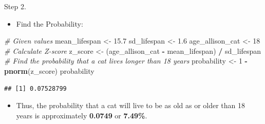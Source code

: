 \documentclass[
  ignorenonframetext,
]{beamer}
\newenvironment{Shaded}{\begin{snugshade}}{\end{snugshade}}
\newcommand{\CommentTok}[1]{\textcolor[rgb]{0.56,0.35,0.01}{\textit{#1}}}
\newcommand{\DecValTok}[1]{\textcolor[rgb]{0.00,0.00,0.81}{#1}}
\newcommand{\FloatTok}[1]{\textcolor[rgb]{0.00,0.00,0.81}{#1}}
\newcommand{\FunctionTok}[1]{\textcolor[rgb]{0.13,0.29,0.53}{\textbf{#1}}}
\newcommand{\NormalTok}[1]{#1}
\newcommand{\OtherTok}[1]{\textcolor[rgb]{0.56,0.35,0.01}{#1}}
\newcommand{\SpecialCharTok}[1]{\textcolor[rgb]{0.81,0.36,0.00}{\textbf{#1}}}
\providecommand{\tightlist}{%
  \setlength{\itemsep}{0pt}\setlength{\parskip}{0pt}}
\begin{document}
\begin{frame}[fragile]{Step 2.}
\label{step-2.}
\begin{itemize}
\tightlist
\item
  Find the Probability:
\end{itemize}

\begin{Shaded}
\begin{Highlighting}[]
\CommentTok{\# Given values}
\NormalTok{mean\_lifespan }\OtherTok{\textless{}{-}} \FloatTok{15.7}
\NormalTok{sd\_lifespan }\OtherTok{\textless{}{-}} \FloatTok{1.6}
\NormalTok{age\_allison\_cat }\OtherTok{\textless{}{-}} \DecValTok{18}
\CommentTok{\# Calculate Z{-}score}
\NormalTok{z\_score }\OtherTok{\textless{}{-}}\NormalTok{ (age\_allison\_cat }\SpecialCharTok{{-}}\NormalTok{ mean\_lifespan) }\SpecialCharTok{/}\NormalTok{ sd\_lifespan}
\CommentTok{\# Find the probability that a cat lives longer than 18 years}
\NormalTok{probability }\OtherTok{\textless{}{-}} \DecValTok{1} \SpecialCharTok{{-}} \FunctionTok{pnorm}\NormalTok{(z\_score)}
\NormalTok{probability}
\end{Highlighting}
\end{Shaded}

\begin{verbatim}
## [1] 0.07528799
\end{verbatim}

\begin{itemize}
\tightlist
\item
  Thus, the probability that a cat will live to be as old as or older
  than 18 years is approximately \textbf{0.0749} or \textbf{7.49\%}.
\end{itemize}
\end{frame}
\end{document}
